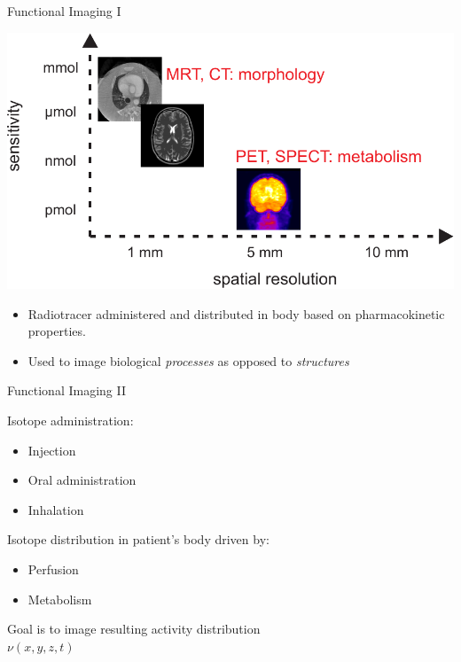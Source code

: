 \begin{frame}{Functional Imaging I}
    \begin{center}\includegraphics[height=0.7\textheight]{../00_motivation/Bilder/moletab.pdf}\\
        \begin{itemize}
            \item {Radiotracer administered and distributed in body based on pharmacokinetic properties.}\\
            \item {Used to image biological \emph{processes} as opposed to \emph{structures}}

        \end{itemize}
    \end{center}
\end{frame}


\begin{frame}{Functional Imaging II}
    \begin{center}%
        {
            \raggedright
            Isotope administration:\\
            \begin{itemize}
                \item{Injection}\\
                \item{Oral administration}\\
                \item{Inhalation}\\
            \end{itemize}

            Isotope distribution in patient's body driven by:\\
            \begin{itemize}
                \item{Perfusion}\\
                \item{Metabolism}\\
            \end{itemize}
        }
        \bigskip
        {\LARGE Goal is to image resulting activity distribution\\
            \bigskip
            {$\nu$}$(x,y,z,t)$}\\
    \end{center}
\end{frame}


